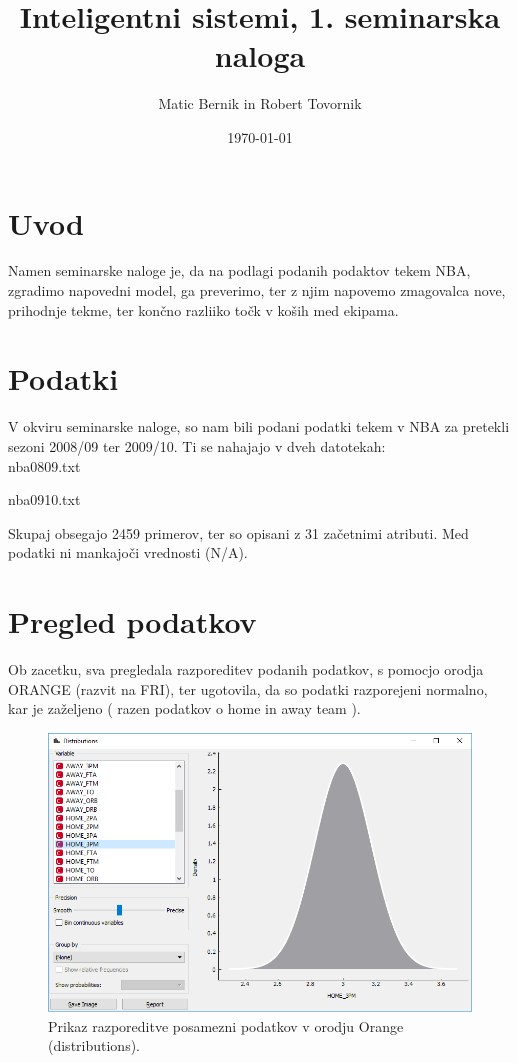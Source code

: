 \documentclass[a4paper,11pt]{article}
\title{Inteligentni sistemi, 1. seminarska naloga}
\author{Matic Bernik in Robert Tovornik}
\date{\today}
\begin{document}
\maketitle

\section{Uvod}

Namen seminarske naloge je, da na podlagi podanih podaktov tekem NBA, 
zgradimo napovedni model, ga preverimo, ter z njim napovemo zmagovalca 
nove, prihodnje tekme, ter končno razliiko točk v koših med ekipama.

\section{Podatki}

V okviru seminarske naloge, so nam bili podani podatki tekem v NBA za pretekli 
 sezoni 2008/09 ter 2009/10. Ti se nahajajo v dveh datotekah: \\

\textendash  nba0809.txt 

\textendash  nba0910.txt

Skupaj obsegajo 2459 primerov, ter so opisani z 31 začetnimi atributi.
Med podatki ni mankajoči vrednosti (N/A).

\section{Pregled podatkov}

Ob zacetku, sva pregledala razporeditev podanih podatkov, s pomocjo orodja 
ORANGE (razvit na FRI), ter ugotovila, da so podatki razporejeni normalno, kar
 je zaželjeno ( razen podatkov o home in away team ).

\begin{figure}[H]
\begin{center}
\includegraphics[scale=0.3]{OC_data_dist.png}
\caption{Prikaz razporeditve posamezni podatkov v orodju Orange (distributions).}
\label{slika1}
\end{center}
\end{figure} 
\end{document}
